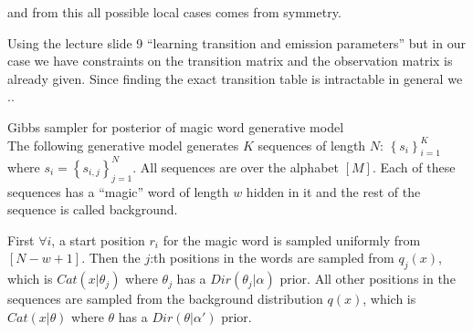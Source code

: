 \documentclass[a4paper,twoside=false,abstract=false,numbers=noenddot,
titlepage=false,headings=small,parskip=half,version=last]{scrartcl}
\begin{document}
\begin{solution}
    and from this all possible local cases comes from symmetry.




    Using the lecture slide 9 
    ``learning transition and emission parameters''
    but in our case we have constraints on the transition matrix and the
    observation matrix is already given.
    Since finding the exact transition table is intractable in general we ..

\end{solution}

\begin{exercise}{3}Gibbs sampler for posterior of magic word generative model\\
    The following generative model generates $K$ sequences of length $N$:
    $\left\{s_i\right\}_{i=1}^K$ where $s_i=\left\{s_{i,j}\right\}_{j=1}^N$.
    All sequences are over the alphabet $\left[M\right]$. Each of these
    sequences has a ``magic'' word of length $w$ hidden in it and the rest of
    the sequence is called background.

    First $\forall i$, a start position $r_i$ for the magic word is sampled
    uniformly from $\left[N-w+1\right]$. Then the $j$:th positions in the words
    are sampled from $q_j(x)$, which is $Cat\left(x|\theta_j\right)$ where 
    $\theta_j$ has a $Dir\left(\theta_j|\alpha\right)$ prior. All other
    positions in the sequences are sampled from the background distribution
    $q(x)$, which is $Cat\left(x|\theta\right)$ where $\theta$ has a
    $Dir\left(\theta|\alpha'\right)$ prior.
\end{exercise}
\begin{solution}
    
\end{solution}
\end{document}
